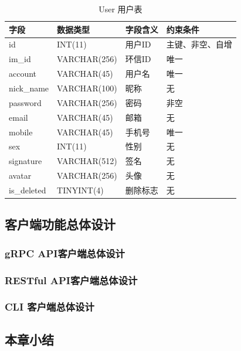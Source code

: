 		\begin{table}[H]
		\centering
		\caption{User 用户表}
		\label{tab:db_table_user}
		\begin{tabular}{p{}p{}p{}p{}}
		\hline
		字段          & 数据类型         & 字段含义   & 约束条件     \\ \hline
		id          & INT(11)      & 用户ID & 主键、非空、自增 \\
		im\_id      & VARCHAR(256) & 环信ID & 唯一       \\ 
		account     & VARCHAR(45)  & 用户名  & 唯一       \\ 
		nick\_name  & VARCHAR(100) & 昵称   & 无        \\
		password    & VARCHAR(256) & 密码   & 非空       \\ 
		email       & VARCHAR(45)  & 邮箱   & 无        \\
		mobile      & VARCHAR(45)  & 手机号  & 唯一        \\ 
		sex         & INT(11)      & 性别   & 无        \\ 
		signature   & VARCHAR(512) & 签名   & 无        \\
		avatar      & VARCHAR(256) & 头像   & 无        \\
		is\_deleted & TINYINT(4)   & 删除标志 & 无        \\ \hline
		\end{tabular}
		\end{table}
	

	\subsection{客户端功能总体设计}
	
	\subsubsection{gRPC API客户端总体设计}
	\subsubsection{RESTful API客户端总体设计}
	\subsubsection{CLI 客户端总体设计}
	\subsection{本章小结}
	
 \clearpage